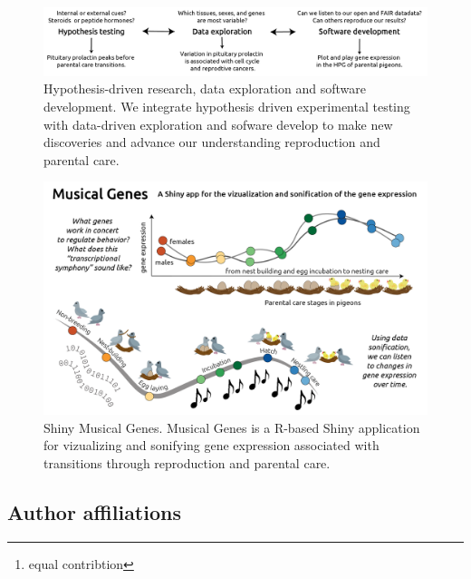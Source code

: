 \newpage

\begin{figure}[ht]
  \centering
  \includegraphics[width=1.0\textwidth]{../../figures/images/fig_fig5}
  \caption{Hypothesis-driven research, data exploration and software development. We integrate hypothesis driven experimental testing with data-driven exploration and sofware develop to make new discoveries and advance our understanding reproduction and parental care.}
  \label{figure:fig5}
\end{figure}



\begin{figure}[ht]
  \centering
  \includegraphics[width=1.0\textwidth]{../../figures/supplfig3}
  \caption{Shiny Musical Genes. Musical Genes is a R-based Shiny application for vizualizing and sonifying gene expression associated with transitions through reproduction and parental care.}
  \label{figure:fig6}
\end{figure}




\hypertarget{author-affiliations}{%
\subsection{Author affiliations}\label{author-affiliations}}


\address{%
Rayna M Harris \footnote{equal contribtion}\\
University of California, Davis\\
\\
}


